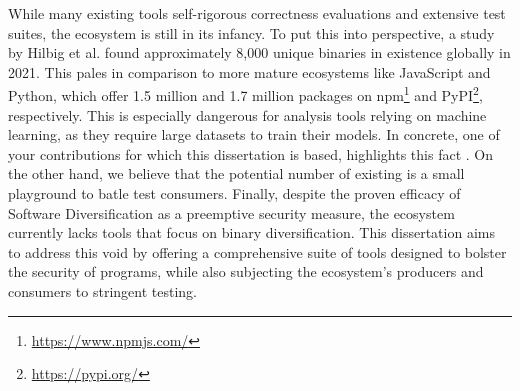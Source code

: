 While many existing tools  self-rigorous correctness evaluations and extensive test suites, the \Wasm ecosystem is still in its infancy. 
To put this into perspective, a study by Hilbig et al.\cite{Hilbig2021AnES} found approximately 8,000 unique \Wasm binaries in existence globally in 2021.
This pales in comparison to more mature ecosystems like JavaScript and Python, which offer 1.5 million and 1.7 million packages on npm\footnote{\url{https://www.npmjs.com/}} and PyPI\footnote{\url{https://pypi.org/}}, respectively. 
This is especially dangerous for analysis tools relying on machine learning, as they require large datasets to train their models.
In concrete, one of your contributions for which this dissertation is based, highlights this fact \cite{EVASION}.
On the other hand, we believe that the potential number of existing \Wasm is a small playground to batle test consumers. 
Finally,  despite the proven efficacy of Software Diversification as a preemptive security measure, the \Wasm ecosystem currently lacks tools that focus on binary diversification. 
This dissertation aims to address this void by offering a comprehensive suite of tools designed to bolster the security of \Wasm programs, while also subjecting the ecosystem's producers and consumers to stringent testing.




